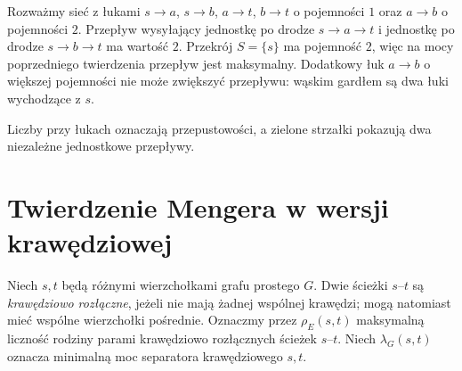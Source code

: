 \begin{przyklad}
Rozważmy sieć z łukami $s\to a$, $s\to b$, $a\to t$,
$b\to t$ o pojemności $1$ oraz $a\to b$ o pojemności $2$.
Przepływ wysyłający jednostkę po drodze $s\to a\to t$
i jednostkę po drodze $s\to b\to t$ ma wartość $2$.
Przekrój $S=\{s\}$ ma pojemność $2$, więc na mocy
poprzedniego twierdzenia przepływ jest maksymalny.
Dodatkowy łuk $a\to b$ o większej pojemności
nie może zwiększyć przepływu: wąskim gardłem
są dwa łuki wychodzące z $s$.
\end{przyklad}

\begin{center}

{\footnotesize Liczby przy łukach oznaczają przepustowości,
a zielone strzałki pokazują dwa niezależne jednostkowe przepływy.}
\end{center}

\section{Twierdzenie Mengera w wersji krawędziowej}
\label{sec:tg-menger-edges}

\begin{definicja}
Niech $s,t$ będą różnymi wierzchołkami grafu prostego $G$.
Dwie ścieżki $s$--$t$ są \emph{krawędziowo rozłączne},
jeżeli nie mają żadnej wspólnej krawędzi; mogą natomiast
mieć wspólne wierzchołki pośrednie. Oznaczmy przez
$\rho_E(s,t)$ maksymalną liczność rodziny parami
krawędziowo rozłącznych ścieżek $s$--$t$.
Niech $\lambda_G(s,t)$ oznacza minimalną moc separatora
krawędziowego $s,t$.
\end{definicja}

